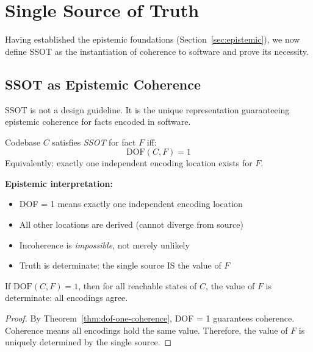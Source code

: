 \section{Single Source of Truth}\label{sec:ssot}

Having established the epistemic foundations (Section~\ref{sec:epistemic}), we now define SSOT as the instantiation of coherence to software and prove its necessity.

\subsection{SSOT as Epistemic Coherence}\label{sec:ssot-def}

SSOT is not a design guideline. It is the unique representation guaranteeing epistemic coherence for facts encoded in software.

\begin{definition}\label{def:ssot}
Codebase $C$ satisfies \emph{SSOT} for fact $F$ iff:
\[
\text{DOF}(C, F) = 1
\]
Equivalently: exactly one independent encoding location exists for $F$.
\end{definition}

\textbf{Epistemic interpretation:}
\begin{itemize}
\tightlist
\item DOF = 1 means exactly one independent encoding location
\item All other locations are derived (cannot diverge from source)
\item Incoherence is \emph{impossible}, not merely unlikely
\item Truth is determinate: the single source IS the value of $F$
\end{itemize}

\begin{theorem}\label{thm:ssot-determinate}
If $\text{DOF}(C, F) = 1$, then for all reachable states of $C$, the value of $F$ is determinate: all encodings agree.
\end{theorem}

\begin{proof}
By Theorem~\ref{thm:dof-one-coherence}, DOF = 1 guarantees coherence. Coherence means all encodings hold the same value. Therefore, the value of $F$ is uniquely determined by the single source.
\end{proof}

